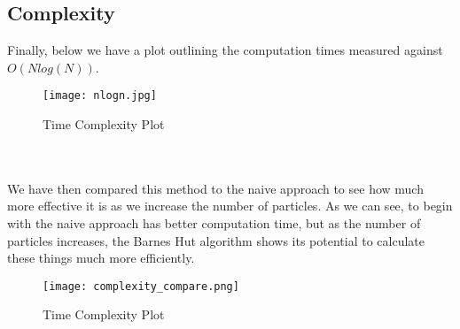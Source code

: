 \documentclass{article}
\begin{document}
\subsection{Complexity}
Finally, below we have a plot outlining the computation times measured against $O(Nlog(N))$.
\begin{figure}[htb]
\begin{center}
\texttt{[image: nlogn.jpg]}
\caption{Time Complexity Plot}
\end{center}
\end{figure}
\\\\
We have then compared this method to the naive approach to see how much more effective it is as we increase the number of particles. As we can see, to begin with the naive approach has better computation time, but as the number of particles increases, the Barnes Hut algorithm shows its potential to calculate these things much more efficiently. 
\begin{figure}[htb]
\begin{center}
\texttt{[image: complexity\_compare.png]}
\caption{Time Complexity Plot}
\end{center}
\end{figure}
\newpage
\end{document}
